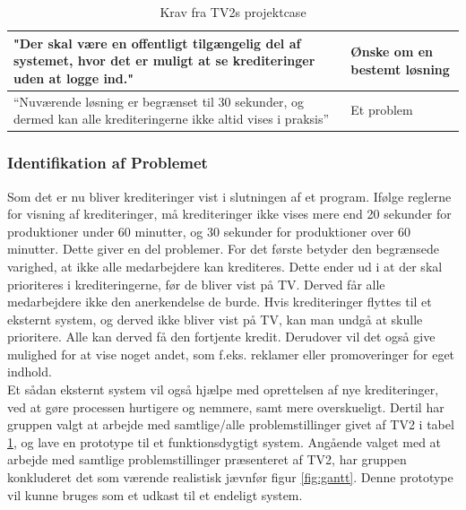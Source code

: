 \begin{table}[ht]
\begin{tabularx}{\textwidth}{|p{10cm}|X|}
        \hline
        "Der skal være en offentligt tilgængelig del af systemet, hvor det er muligt at se krediteringer uden at logge ind."
        & Ønske om en bestemt løsning \\
        
        \hline
        “Nuværende løsning er begrænset til 30 sekunder, og dermed kan alle krediteringerne ikke altid vises i praksis” 
        & Et problem \\
        \hline
    \end{tabularx}    
    \caption{Krav fra TV2s projektcase}
    \label{table:kravFraCase}
\end{table}


\subsubsection{Identifikation af Problemet}
Som det er nu bliver krediteringer vist i slutningen af et program. Ifølge reglerne for visning af krediteringer, må krediteringer ikke vises mere end 20 sekunder for produktioner under 60 minutter, og 30 sekunder for produktioner over 60 minutter. Dette giver en del problemer. For det første betyder den begrænsede varighed, at ikke alle medarbejdere kan krediteres. Dette ender ud i at der skal prioriteres i krediteringerne, før de bliver vist på TV. Derved får alle medarbejdere ikke den anerkendelse de burde.
Hvis krediteringer flyttes til et eksternt system, og derved ikke bliver vist på TV, kan man undgå at skulle prioritere. Alle kan derved få den fortjente kredit. Derudover vil det også give mulighed for at vise noget andet, som f.eks. reklamer eller promoveringer for eget indhold. \cite{DR-Krediteringsregler} \\

\noindent
Et sådan eksternt system vil også hjælpe med oprettelsen af nye krediteringer, ved at gøre processen hurtigere og nemmere, samt mere overskueligt. Dertil har gruppen valgt at arbejde med samtlige/alle problemstillinger givet af TV2 i tabel \ref{table:kravFraCase}, og lave en prototype til et funktionsdygtigt system. Angående valget med at arbejde med samtlige problemstillinger præsenteret af TV2, har gruppen konkluderet det som værende realistisk jævnfør figur \ref{fig:gantt}. Denne prototype vil kunne bruges som et udkast til et endeligt system.


